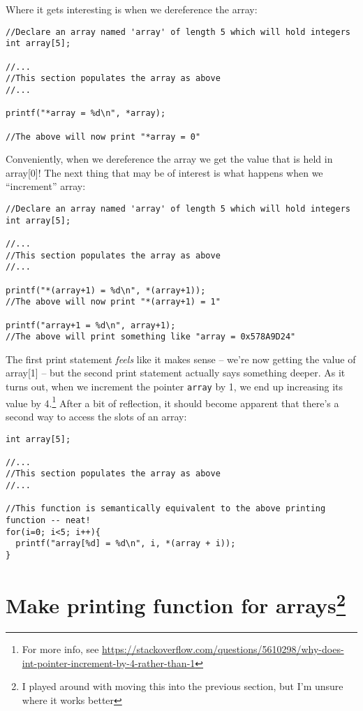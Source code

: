 \documentclass[10pt]{article}
\begin{document}
\noindent Where it gets interesting is when we dereference the array:

\begin{lstlisting}
//Declare an array named 'array' of length 5 which will hold integers
int array[5];

//...
//This section populates the array as above
//...

printf("*array = %d\n", *array);

//The above will now print "*array = 0"

\end{lstlisting}

\noindent Conveniently, when we dereference the array we get the value that is held in array[0]! The next thing that may be of interest is what happens when we ``increment'' array:

\begin{lstlisting}
//Declare an array named 'array' of length 5 which will hold integers
int array[5];

//...
//This section populates the array as above
//...

printf("*(array+1) = %d\n", *(array+1));
//The above will now print "*(array+1) = 1"

printf("array+1 = %d\n", array+1);
//The above will print something like "array = 0x578A9D24"

\end{lstlisting}

\noindent The first print statement \textit{feels} like it makes sense -- we're now getting the value of array[1] -- but the second print statement actually says something deeper. As it turns out, when we increment the pointer \texttt{array} by 1, we end up increasing its value by 4.\footnote{For more info, see \url{https://stackoverflow.com/questions/5610298/why-does-int-pointer-increment-by-4-rather-than-1}} After a bit of reflection, it should become apparent that there's a second way to access the slots of an array:


\begin{lstlisting}
int array[5];

//...
//This section populates the array as above
//...

//This function is semantically equivalent to the above printing function -- neat!
for(i=0; i<5; i++){
  printf("array[%d] = %d\n", i, *(array + i));
}

\end{lstlisting}


\section*{Make printing function for arrays\footnote{I played around with moving this into the previous section, but I'm unsure where it works better}}
\end{document}
